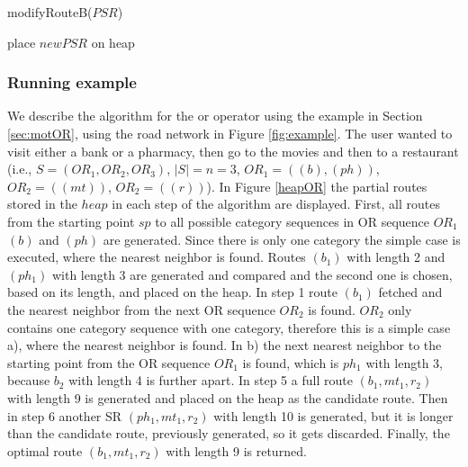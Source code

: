\begin{procedure}[H]
	\label{proc:modifyRouteB}
	\caption{modifyRouteB($PSR$)}
	
	
	place $newPSR$ on heap\;
\end{procedure}

\subsubsection{Running example}
We describe the algorithm for the or operator using the example in Section \ref{sec:motOR}, using the road network in Figure \ref{fig:example}. The user wanted to visit either a bank or a pharmacy, then go to the movies and then to a restaurant (i.e., $S = (OR_1, OR_2, OR_3)$, $|S| = n = 3$, $OR_1 = ((b), (ph))$, $OR_2 = ((mt))$, $OR_2 = ((r))$). In Figure \ref{heapOR} the partial routes stored in the $heap$ in each step of the algorithm are displayed.
First, all routes from the starting point $sp$ to all possible category sequences in OR sequence $OR_1$ $(b)$ and $(ph)$ are generated. Since there is only one category the simple case is executed, where the nearest neighbor is found. Routes $(b_1)$ with length 2 and $(ph_1)$ with length 3 are generated and compared and the second one is chosen, based on its length, and placed on the heap. In step 1 route $(b_1)$ fetched and the nearest neighbor from the next OR sequence $OR_2$ is found. $OR_2$ only contains one category sequence with one category, therefore this is a simple case a), where the nearest neighbor is found. In b) the next nearest neighbor to the starting point from the OR sequence $OR_1$ is found, which is $ph_1$ with length 3, because $b_2$ with length 4 is further apart. 
In step 5 a full route $(b_1, mt_1, r_2)$ with length 9 is generated and placed on the heap as the candidate route. Then in step 6 another SR $(ph_1, mt_1, r_2)$ with length 10 is generated, but it is longer than the candidate route, previously generated, so it gets discarded. Finally, the optimal route $(b_1, mt_1, r_2)$ with length 9 is returned.

